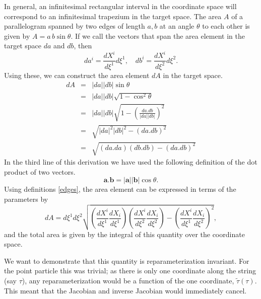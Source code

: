 \documentclass[a4paper,12pt]{article}
\numberwithin{equation}{section}
\begin{document}
In general, an infinitesimal rectangular interval in the coordinate space will correspond to an infinitesimal trapezium in the target space. The area $A$ of a parallelogram spanned by two edges of length $a, b$ at an angle $\theta$ to each other is given by $A = a \,b \sin \theta$. If we call the vectors that span the area element in the target space $da$ and $db$, then
\begin{equation}\label{edges}
da^i = \frac{dX^i}{d\xi^1}d\xi^1,\quad db^i= \frac{dX^i}{d\xi^2}d\xi^2.
\end{equation}
Using these, we can construct the area element $dA$ in the target space.
\begin{eqnarray*}
dA & = & |da||db|\sin\theta \\
& = & |da||db|\sqrt{1-\cos^2\theta} \\
& = & |da||db|\sqrt{1 - \left(\frac{da.db}{|da||db|}\right)^2} \\
& = & \sqrt{|da|^2|db|^2 - (da.db)^2} \\
& = & \sqrt{(da.da)(db.db) - (da.db)^2}
\end{eqnarray*}
In the third line of this derivation we have used the following definition of the dot product of two vectors.
\begin{equation}
\mathbf{a}.\mathbf{b} = |\mathbf{a}||\mathbf{b}|\cos\theta.
\end{equation}
Using definitions \ref{edges}, the area element can be expressed in terms of the parameters by 
\begin{equation}\label{areaelement}
dA = d\xi^1d\xi^2\sqrt{\left(\frac{dX^i}{d\xi^1}\frac{dX_i}{d\xi^1}\right)\left(\frac{dX^i}{d\xi^2}\frac{dX_i}{d\xi^2}\right) - \left(\frac{dX^i}{d\xi^1}\frac{dX_i}{d\xi^2}\right)^2},
\end{equation} 
and the total area is given by the integral of this quantity over the coordinate space.

We want to demonstrate that this quantity is reparameterization invariant. For the point particle this was trivial; as there is only one coordinate along the string (say $\tau$), any reparameterization would be a function of the one coordinate, $\tilde{\tau}(\tau)$. This meant that the Jacobian and inverse Jacobian would immediately cancel.
\end{document}
